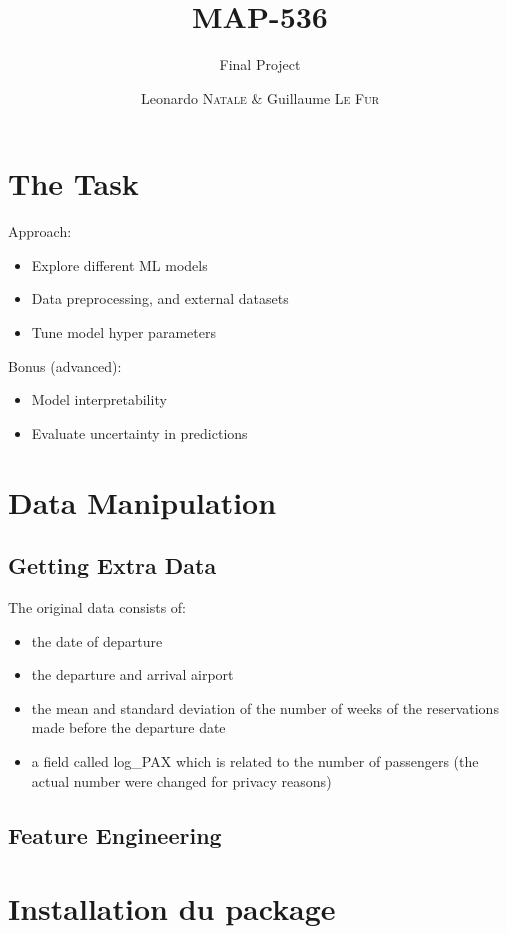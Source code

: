 \documentclass[a4paper,12pt,twoside]{article}
\title{MAP-536}
\subtitle{Final Project}
\author{Leonardo \textsc{Natale} \& Guillaume \textsc{Le Fur}}
\begin{document}
\maketitle

\section{The Task}
Approach:
\begin{itemize}
	\item Explore different ML models
	\item Data preprocessing, and external datasets
	\item Tune model hyper parameters \\

\end{itemize}
Bonus (advanced):
\begin{itemize}
	\item Model interpretability
	\item Evaluate uncertainty in predictions
\end{itemize}

\section{Data Manipulation}

\subsection{Getting Extra Data}
The original data consists of:
\begin{itemize}
	\item the date of departure
	\item the departure and arrival airport
	\item the mean and standard deviation of the number of weeks of the reservations made before the departure date
    \item a field called log\_PAX which is related to the number of passengers (the actual number were changed for privacy reasons)
\end{itemize}

\subsection{Feature Engineering}

\section{Installation du package}
\end{document}
